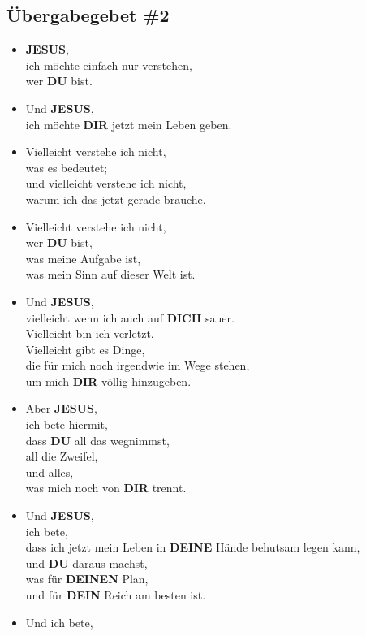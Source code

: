 \documentclass[12pt,a5paper]{article}
\newcommand{\Deinen}[0]{\textbf{DEINEN}}
\newcommand{\Deine}[0]{\textbf{DEINE}}
\newcommand{\Dein}[0]{\textbf{DEIN}}
\newcommand{\Dich}[0]{\textbf{DICH}}
\newcommand{\Dir}[0]{\textbf{DIR}}
\newcommand{\Du}[0]{\textbf{DU}}
\newcommand{\Jesus}[0]{\textbf{JESUS}}
\begin{document}
	\subsection{\"Ubergabegebet \#2}
		\begin{itemize}[nosep]
			\item	{\Jesus},
			\\		ich m\"ochte einfach nur verstehen,
			\\		wer {\Du} bist.
			\item	Und {\Jesus},
			\\		ich m\"ochte {\Dir} jetzt mein Leben geben.
			\item	Vielleicht verstehe ich nicht,
			\\		was es bedeutet;
			\\		und vielleicht verstehe ich nicht,
			\\		warum ich das jetzt gerade brauche.
			\item	Vielleicht verstehe ich nicht,
			\\		wer {\Du} bist,
			\\		was meine Aufgabe ist,
			\\		was mein Sinn auf dieser Welt ist.
			\item	Und {\Jesus},
			\\		vielleicht wenn ich auch auf {\Dich} sauer.
			\\		Vielleicht bin ich verletzt.
			\\		Vielleicht gibt es Dinge,
			\\		die f\"ur mich noch irgendwie im Wege stehen,
			\\		um mich {\Dir} v\"ollig hinzugeben.
			\item	Aber {\Jesus},
			\\		ich bete hiermit,
			\\		dass {\Du} all das wegnimmst,
			\\		all die Zweifel,
			\\		und alles,
			\\		was mich noch von {\Dir} trennt.
			\item	Und {\Jesus},
			\\		ich bete,
			\\		dass ich jetzt mein Leben in {\Deine} H\"ande behutsam legen kann,
			\\		und {\Du} daraus machst,
			\\		was f\"ur {\Deinen} Plan,
			\\		und f\"ur {\Dein} Reich am besten ist.
			\item	Und ich bete,

\end{itemize}
\end{document}
